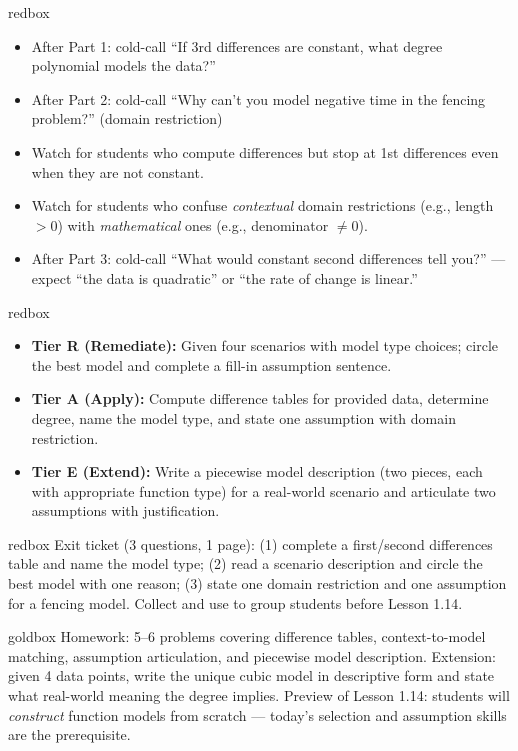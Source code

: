 \documentclass[10pt]{article}
\begin{document}
\begin{skillbox}{redbox}
\begin{itemize}[leftmargin=1.2em,itemsep=2pt,topsep=0pt]
  \item After Part 1: cold-call ``If 3rd differences are constant, what degree polynomial models the data?''
  \item After Part 2: cold-call ``Why can't you model negative time in the fencing problem?'' (domain restriction)
  \item Watch for students who compute differences but stop at 1st differences even when they are not constant.
  \item Watch for students who confuse \textit{contextual} domain restrictions (e.g., length $> 0$) with
        \textit{mathematical} ones (e.g., denominator $\neq 0$).
  \item After Part 3: cold-call ``What would constant second differences tell you?'' --- expect ``the data
        is quadratic'' or ``the rate of change is linear.''
\end{itemize}
\end{skillbox}

\begin{skillbox}{redbox}
\begin{itemize}[leftmargin=1.2em,itemsep=2pt,topsep=0pt]
  \item \textbf{Tier R (Remediate):} Given four scenarios with model type choices; circle the best model
        and complete a fill-in assumption sentence.
  \item \textbf{Tier A (Apply):} Compute difference tables for provided data, determine degree, name the
        model type, and state one assumption with domain restriction.
  \item \textbf{Tier E (Extend):} Write a piecewise model description (two pieces, each with appropriate
        function type) for a real-world scenario and articulate two assumptions with justification.
\end{itemize}
\end{skillbox}

\begin{skillbox}{redbox}
Exit ticket (3 questions, 1 page): (1) complete a first/second differences table and name the
model type; (2) read a scenario description and circle the best model with one reason; (3) state
one domain restriction and one assumption for a fencing model. Collect and use to group students
before Lesson 1.14.
\end{skillbox}

\begin{skillbox}{goldbox}
Homework: 5--6 problems covering difference tables, context-to-model matching, assumption
articulation, and piecewise model description. Extension: given 4 data points, write the
unique cubic model in descriptive form and state what real-world meaning the degree implies.
Preview of Lesson 1.14: students will \textit{construct} function models from scratch --- today's
selection and assumption skills are the prerequisite.
\end{skillbox}
\end{document}
